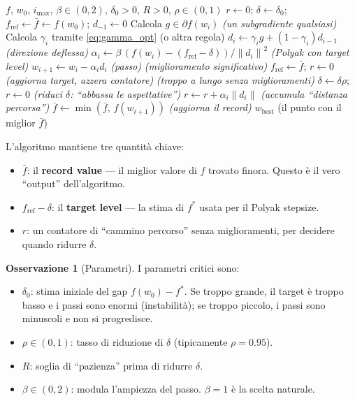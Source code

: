 \documentclass[a4paper,11pt]{article}
\theoremstyle{definition}
\newtheorem{remark}[theorem]{Osservazione}
\newcommand{\norm}[1]{\left\lVert #1 \right\rVert}
\begin{document}
\begin{algorithm}[H]
\caption{Deflected Subgradient con Target Level}
\label{alg:deflected}
\begin{algorithmic}[1]
\Require $f$, $w_0$, $i_{\max}$, $\beta \in (0, 2)$, $\delta_0 > 0$, $R > 0$, $\rho \in (0,1)$
\State $r \gets 0$; $\delta \gets \delta_0$; $f_{\text{ref}} \gets \bar{f} \gets f(w_0)$; $d_{-1} \gets 0$
  \State Calcola $g \in \partial f(w_i)$ \hfill\emph{(un subgradiente qualsiasi)}
  \State Calcola $\gamma_i$ tramite \eqref{eq:gamma_opt} (o altra regola)
  \State $d_i \gets \gamma_i g + (1 - \gamma_i) d_{i-1}$ \hfill\emph{(direzione deflessa)}
  \State $\alpha_i \gets \beta\, (f(w_i) - (f_{\text{ref}} - \delta)) / \norm{d_i}^2$ \hfill\emph{(Polyak con target level)}
  \State $w_{i+1} \gets w_i - \alpha_i d_i$ \hfill\emph{(passo)}
   \hfill\emph{(miglioramento significativo)}
    \State $f_{\text{ref}} \gets \bar{f}$; $r \gets 0$ \hfill\emph{(aggiorna target, azzera contatore)}
   \hfill\emph{(troppo a lungo senza miglioramenti)}
    \State $\delta \gets \delta \rho$; $r \gets 0$ \hfill\emph{(riduci $\delta$: ``abbassa le aspettative'')}
  \Else
    \State $r \gets r + \alpha_i\norm{d_i}$ \hfill\emph{(accumula ``distanza percorsa'')}
  \EndIf
  \State $\bar{f} \gets \min(\bar{f},\, f(w_{i+1}))$ \hfill\emph{(aggiorna il record)}
\EndFor
\State \Return $w_{\text{best}}$ (il punto con il miglior $\bar{f}$)
\end{algorithmic}
\end{algorithm}

\begin{riassunto}
L'algoritmo mantiene tre quantità chiave:
\begin{itemize}[nosep]
  \item $\bar{f}$: il \textbf{record value} --- il miglior valore di $f$ trovato finora. Questo è il vero ``output'' dell'algoritmo.
  \item $f_{\text{ref}} - \delta$: il \textbf{target level} --- la stima di $f^*$ usata per il Polyak stepsize.
  \item $r$: un contatore di ``cammino percorso'' senza miglioramenti, per decidere quando ridurre $\delta$.
\end{itemize}
\end{riassunto}

\begin{remark}[Parametri]
I parametri critici sono:
\begin{itemize}
  \item $\delta_0$: stima iniziale del gap $f(w_0) - f^*$. Se troppo grande, il target è troppo basso e i passi sono enormi (instabilità); se troppo piccolo, i passi sono minuscoli e non si progredisce.
  \item $\rho \in (0,1)$: tasso di riduzione di $\delta$ (tipicamente $\rho = 0.95$).
  \item $R$: soglia di ``pazienza'' prima di ridurre $\delta$.
  \item $\beta \in (0,2)$: modula l'ampiezza del passo. $\beta = 1$ è la scelta naturale.
\end{itemize}
\end{remark}
\end{document}
